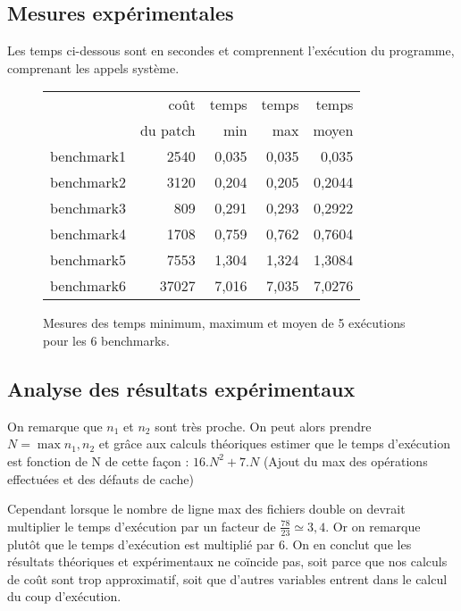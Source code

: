 \documentclass[a4paper, 10pt, french]{article}
\begin{document}
  \subsection{Mesures expérimentales}
    Les temps ci-dessous sont en secondes et comprennent l'exécution du programme, comprenant les appels système.

    \begin{figure}[h]
      \begin{center}
        \begin{tabular}{|l||r||r|r|r||}
          \hline
          \hline
            & coût         & temps     & temps   & temps \\
            & du patch     & min       & max     & moyen \\
          \hline
          \hline
            benchmark1 &   2540   & 0,035  &  0,035  &  0,035 \\
          \hline
            benchmark2 &   3120   & 0,204  &  0,205  &  0,2044 \\
          \hline
            benchmark3 &   809   &  0,291  &  0,293  &  0,2922 \\
          \hline
            benchmark4 &   1708  & 0,759  &  0,762  &  0,7604 \\
          \hline
            benchmark5 &   7553   & 1,304  &  1,324  &  1,3084 \\
          \hline
            benchmark6 &   37027  & 7,016  &  7,035  &  7,0276  \\
          \hline
          \hline
        \end{tabular}
        \caption{Mesures des temps minimum, maximum et moyen de 5 exécutions pour les 6 benchmarks.}
        \label{table-temps}
      \end{center}
    \end{figure}

\subsection{Analyse des résultats expérimentaux}
On remarque que $n_1$ et $n_2$ sont très proche. On peut alors prendre $N = \max{n_1, n_2}$ et grâce aux calculs théoriques estimer que le temps d'exécution est fonction de N de cette façon : $16.N^2 +7.N$  (Ajout du max des opérations effectuées et des défauts de cache)

Cependant lorsque le nombre de ligne max des fichiers double on devrait multiplier le temps d'exécution par un facteur de $\frac{78}{23} \simeq 3,4$. Or on remarque plutôt que le temps d'exécution est multiplié par 6. On en conclut que les résultats théoriques et expérimentaux ne coïncide pas, soit parce que nos calculs de coût sont trop approximatif, soit que d'autres variables entrent dans le calcul du coup d'exécution.
\end{document}
